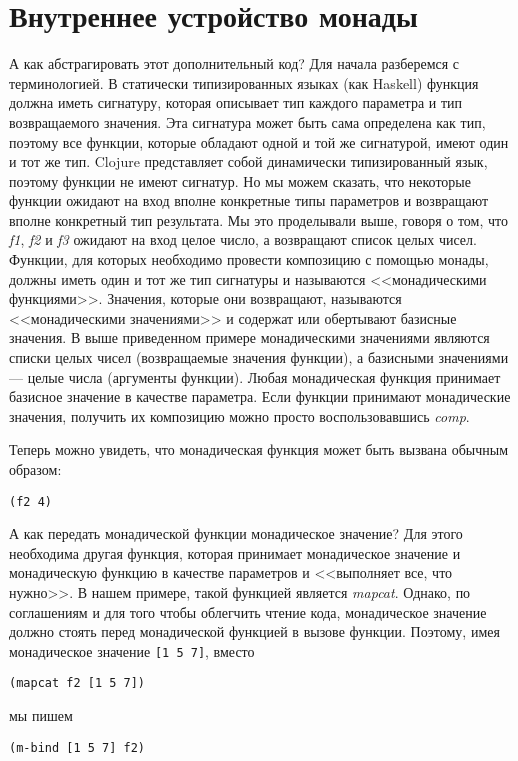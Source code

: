 \documentclass[a4paper,12pt]{article}
\newcommand{\cl}[1] {{\it #1}}
\begin{document}
\section{Внутреннее устройство монады}\label{monad-mechanics}
А как абстрагировать этот дополнительный код? Для начала разберемся с терминологией. 
В статически типизированных языках (как Haskell) функция должна иметь сигнатуру, которая описывает
тип каждого параметра и тип возвращаемого значения. Эта сигнатура может быть сама определена как тип,
поэтому все функции, которые обладают одной и той же сигнатурой, имеют один и тот же тип. Clojure представляет
собой динамически типизированный язык, поэтому функции не имеют сигнатур. Но мы можем сказать, что 
некоторые функции ожидают на вход вполне конкретные типы параметров и возвращают вполне конкретный
тип результата. Мы это проделывали выше, говоря о том, что \cl{f1}, \cl{f2} и \cl{f3} ожидают на вход целое число,
а возвращают список целых чисел. Функции, для которых необходимо провести композицию с помощью монады,
должны иметь один и тот же тип сигнатуры и называются <<монадическими функциями>>. Значения, которые они
возвращают, называются <<монадическими значениями>> и содержат или обертывают базисные значения. 
В выше приведенном примере монадическими значениями являются списки целых чисел (возвращаемые значения
функции), а базисными значениями --- целые числа (аргументы функции).
Любая монадическая функция принимает базисное значение в качестве параметра. %
Если функции принимают монадические значения, получить их композицию можно просто воспользовавшись \cl{comp}.

Теперь можно увидеть, что монадическая функция может быть вызвана обычным образом:

\begin{verbatim}
(f2 4)
\end{verbatim}

А как передать монадической функции монадическое значение? Для этого необходима другая функция, которая
принимает монадическое значение и монадическую функцию в качестве параметров и <<выполняет все, что нужно>>. 
В нашем примере, такой функцией является \cl{mapcat}. Однако, по соглашениям и для того чтобы облегчить
чтение кода, монадическое значение должно стоять перед монадической функцией в вызове функции. Поэтому,
имея монадическое значение \verb|[1 5 7]|, вместо 

\begin{verbatim}
(mapcat f2 [1 5 7])
\end{verbatim}
мы пишем
\begin{verbatim}
(m-bind [1 5 7] f2)
\end{verbatim}
\end{document}
